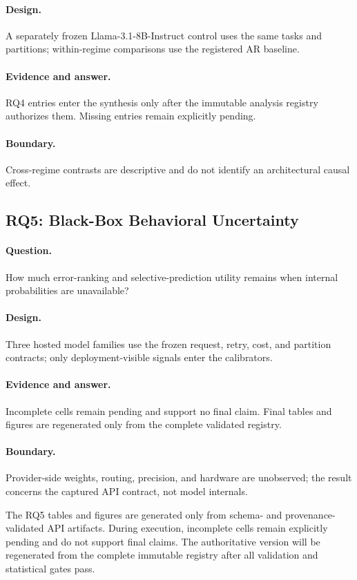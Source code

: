 \documentclass[10pt]{article}
\begin{document}
\paragraph{Design.} A separately frozen Llama-3.1-8B-Instruct control uses the same tasks and partitions; within-regime comparisons use the registered AR baseline.
\paragraph{Evidence and answer.} RQ4 entries enter the synthesis only after the immutable analysis registry authorizes them. Missing entries remain explicitly pending.
\paragraph{Boundary.} Cross-regime contrasts are descriptive and do not identify an architectural causal effect.

\subsection{RQ5: Black-Box Behavioral Uncertainty}

\paragraph{Question.} How much error-ranking and selective-prediction utility remains when internal probabilities are unavailable?
\paragraph{Design.} Three hosted model families use the frozen request, retry, cost, and partition contracts; only deployment-visible signals enter the calibrators.
\paragraph{Evidence and answer.} Incomplete cells remain pending and support no final claim. Final tables and figures are regenerated only from the complete validated registry.
\paragraph{Boundary.} Provider-side weights, routing, precision, and hardware are unobserved; the result concerns the captured API contract, not model internals.

The RQ5 tables and figures are generated only from schema- and
provenance-validated API artifacts. During execution, incomplete cells remain
explicitly pending and do not support final claims. The authoritative version
will be regenerated from the complete immutable registry after all validation
and statistical gates pass.
\end{document}
